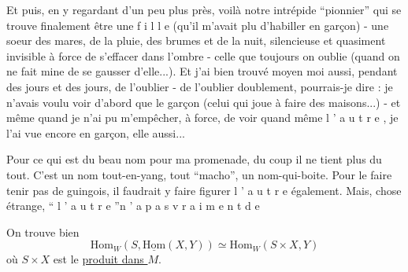 Et puis, en y regardant d'un peu plus près, voilà notre intrépide ``pionnier'' qui se trouve finalement être une f i l l e (qu'il m'avait plu d'habiller en garçon) - une soeur des mares, de la pluie, des brumes et de la nuit, silencieuse et quasiment invisible à force de s'effacer dans l'ombre - celle que toujours on oublie (quand on ne fait mine de se gausser d'elle...). Et j'ai bien trouvé moyen moi aussi, pendant des jours et des jours, de l'oublier - de l'oublier doublement, pourrais-je dire : je n'avais voulu voir d'abord que le garçon (celui qui joue à faire des maisons...) - et même quand je n'ai pu m'empêcher, à force, de voir quand même l ' a u t r e , je l'ai vue encore en garçon, elle aussi...

Pour ce qui est du beau nom pour ma promenade, du coup il ne tient plus du tout. C'est un nom tout-en-yang, tout ``macho'', un nom-qui-boite. Pour le faire tenir pas de guingois, il faudrait y faire figurer l ' a u t r e également. Mais, chose étrange, `` l ' a u t r e ''\quad n ' a \quad p a s \quad v r a i m e n t \quad d e





On trouve bien
\[
\mathrm{Hom}_W(S,\underline{\mathrm{Hom}}(X,Y))\simeq\mathrm{Hom}_W(S\times X,Y)
\]
où $S\times X$ est le \uline{produit dans $M$}.

